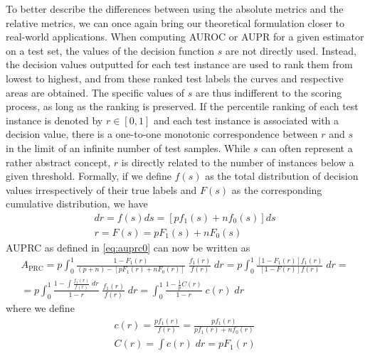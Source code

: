 To better describe the differences between using the absolute metrics and the relative metrics, we can once again bring our theoretical formulation closer to real-world applications. When computing AUROC or AUPR for a given estimator on a test set, the values of the decision function $s$ are not directly used. Instead, the decision values outputted for each test instance are used to rank them from lowest to highest, and from these ranked test labels the curves and respective areas are obtained. The specific values of $s$ are thus indifferent to the scoring process, as long as the ranking is preserved. If the percentile ranking of each test instance is denoted by $r \in [0, 1]$ and each test instance is associated with a decision value, there is a one-to-one monotonic correspondence between $r$ and $s$ in the limit of an infinite number of test samples. While $s$ can often represent a rather abstract concept, $r$ is directly related to the number of instances below a given threshold. Formally, if we define $f(s)$ as the total distribution of decision values irrespectively of their true labels and $F(s)$ as the corresponding cumulative distribution, we have
%
%
\begin{gather}
    dr = f(s) ds = [pf_1(s) + nf_0(s)] ds\\
    r = F(s) = pF_1(s) + nF_0(s)
\end{gather}
%
AUPRC as defined in \autoref{eq:auprc0} can now be written as
%
\begin{multline}
    A_\text{PRC}
    = p \int_{0}^{1}
        \frac{1 - F_1(r)}{(p+n) - [pF_1(r) + nF_0(r)]}
        \; \frac{f_1(r)}{f(r)}
    \;dr
    = p \int_{0}^{1}
        \frac{[1 - F_1(r)]f_1(r)}{[1 - F(r)]f(r)}
    \;dr
    =\\
    = p \int_{0}^{1}
        \frac{1 - \int \frac{f_1(r)}{f(r)} \;dr}{1 - r}
        \; \frac{f_1(r)}{f(r)}
    \;dr
    = \int_{0}^{1}
        \frac{1 - \frac{1}{p}C(r)}{1 - r}
        \; c(r)
    \;dr
    \label{eq:auprc1}
\end{multline}
%
where we define
%
\begin{gather}
    c(r) = \frac{p f_1(r)}{f(r)} = \frac{p f_1(r)}{pf_1(r) + nf_0(r)}\\
    C(r) = \int c(r) \;dr = p F_1(r)
\end{gather}

